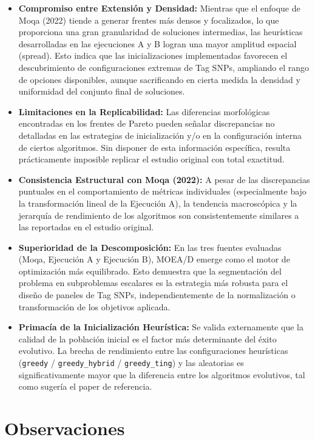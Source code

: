 \documentclass[a4paper,10pt]{article}
\begin{document}
\begin{itemize}
    \item \textbf{Compromiso entre Extensión y Densidad:} Mientras que el enfoque de Moqa (2022) tiende a generar frentes más densos y focalizados, lo que proporciona una gran granularidad de soluciones intermedias, las heurísticas desarrolladas en las ejecuciones A y B logran una mayor amplitud espacial (spread). Esto indica que las inicializaciones implementadas favorecen el descubrimiento de configuraciones extremas de Tag SNPs, ampliando el rango de opciones disponibles, aunque sacrificando en cierta medida la densidad y uniformidad del conjunto final de soluciones.
    \item \textbf{Limitaciones en la Replicabilidad:} Las diferencias morfológicas encontradas en los frentes de Pareto pueden señalar discrepancias no detalladas en las estrategias de inicialización y/o en la configuración interna de ciertos algoritmos. Sin disponer de esta información específica, resulta prácticamente imposible replicar el estudio original con total exactitud.
    \item \textbf{Consistencia Estructural con Moqa (2022):} A pesar de las discrepancias puntuales en el comportamiento de métricas individuales (especialmente bajo la transformación lineal de la Ejecución A), la tendencia macroscópica y la jerarquía de rendimiento de los algoritmos son consistentemente similares a las reportadas en el estudio original.
    \item \textbf{Superioridad de la Descomposición:} En las tres fuentes evaluadas (Moqa, Ejecución A y Ejecución B), MOEA/D emerge como el motor de optimización más equilibrado. Esto demuestra que la segmentación del problema en subproblemas escalares es la estrategia más robusta para el diseño de paneles de Tag SNPs, independientemente de la normalización o transformación de los objetivos aplicada.
    \item \textbf{Primacía de la Inicialización Heurística:} Se valida externamente que la calidad de la población inicial es el factor más determinante del éxito evolutivo. La brecha de rendimiento entre las configuraciones heurísticas (\texttt{greedy} / \texttt{greedy\_hybrid} / \texttt{greedy\_ting}) y las aleatorias es significativamente mayor que la diferencia entre los algoritmos evolutivos, tal como sugería el paper de referencia.
\end{itemize}
\section{Observaciones}
\label{sec:observaciones}
\end{document}
